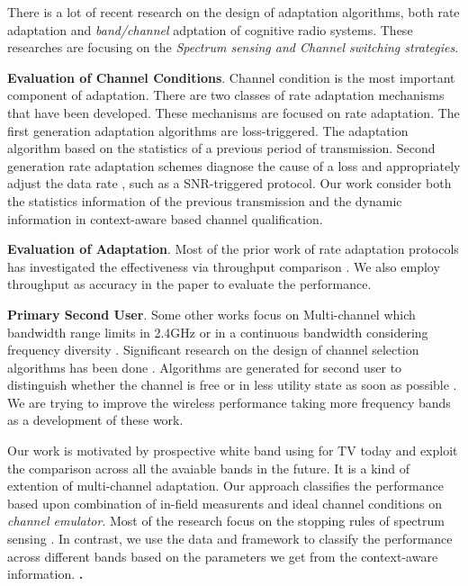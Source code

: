 %

There is a lot of recent research on the design of adaptation algorithms, both rate adaptation and \emph{band/channel} adptation of cognitive radio systems. These researches are focusing on the \emph{Spectrum sensing and Channel switching strategies}.

\textbf{Evaluation of Channel Conditions}. Channel condition is the most important component of adaptation. 
There are two classes of rate adaptation mechanisms that have been developed. 
These mechanisms are focused on rate adaptation. The first generation adaptation algorithms are loss-triggered. The adaptation algorithm based on the statistics of a previous period of transmission. 
Second generation rate adaptation schemes diagnose the cause of a loss and appropriately adjust the data rate \cite{biaz2008rate, camp2010modulation}, such as a SNR-triggered protocol. 
Our work consider both the statistics information of the previous transmission and the dynamic information in context-aware based channel qualification.

\textbf{Evaluation of Adaptation}. Most of the prior work of rate adaptation protocols has investigated the effectiveness via throughput comparison \cite{camp2010modulation}. We also employ throughput as accuracy in the paper to evaluate the performance. 
 
\textbf{Primary Second User}. Some other works focus on Multi-channel which bandwidth range limits in 2.4GHz \cite{MOAR} or in a continuous bandwidth considering frequency diversity \cite{rahul2009frequency}. 
Significant research on the design of channel selection algorithms has been done \cite{radunovic2011dynamic,raniwala2005architecture}. Algorithms are generated for second user to distinguish whether the channel is free or in less utility state as soon as possible \cite{cordeiro2007c}. We are trying to improve the wireless performance taking more frequency bands as a development of these work.

Our work is motivated by prospective white band using for TV today and exploit the comparison across all the avaiable bands in the future. It is a kind of extention of multi-channel adaptation. Our approach classifies the performance based upon combination of in-field measurents and ideal channel conditions on \emph{channel emulator}. 
Most of the research focus on the stopping rules of spectrum sensing \cite{sabharwal2007opportunistic, OAR}. In contrast, we use the data and framework to classify the performance across different bands based on the parameters we get from the context-aware information.
{\bf .} 

